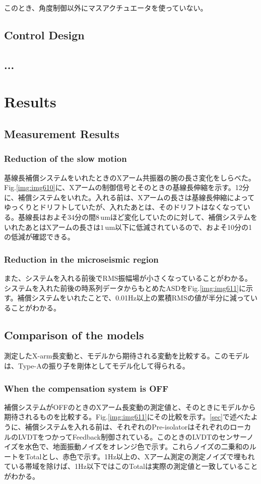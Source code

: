 このとき、角度制御以外にマスアクチュエータを使っていない。


\subsection{Control Design}


\subsection{...}


\section{Results}
\subsection{Measurement Results}
\subsubsection{Reduction of the slow motion}
基線長補償システムをいれたときのXアーム共振器の腕の長さ変化をしらべた。Fig.\ref{img:img610}に、Xアームの制御信号とそのときの基線長伸縮を示す。12分に、補償システムをいれた。入れる前は、Xアームの長さは基線長伸縮によってゆっくりとドリフトしていたが、入れたあとは、そのドリフトはなくなっている。基線長はおよそ34分の間$8\,\mathrm{um}$ほど変化していたのに対して、補償システムをいれたあとはXアームの長さは$1\,\mathrm{um}$以下に低減されているので、およそ10分の1の低減が確認できる。

\subsubsection{Reduction in the microseismic region}
また、システムを入れる前後でRMS振幅場が小さくなっていることがわかる。システムを入れた前後の時系列データからもとめたASDをFig.\ref{img:img611}に示す。補償システムをいれたことで、0.01Hz以上の累積RMSの値が半分に減っていることがわかる。

\subsection{Comparison of the models}
測定したX-arm長変動と、モデルから期待される変動を比較する。このモデルは、Type-Aの振り子を剛体としてモデル化して得られる\cite{sekiguchi2016astudy}。

\subsubsection{When the compensation system is OFF}
補償システムがOFFのときのXアーム長変動の測定値と、そのときにモデルから期待されるものを比較する。Fig.\ref{img:img611}にその比較を示す。\cref{sec}で述べたように、補償システムを入れる前は、それぞれのPre-isolatorはそれぞれのローカルのLVDTをつかってFeedback制御されている。このときのLVDTのセンサーノイズを水色で、地面振動ノイズをオレンジ色で示す。これらノイズの二乗和のルートをTotalとし、赤色で示す。1Hz以上の、Xアーム測定の測定ノイズで埋もれている帯域を除けば、1Hz以下ではこのTotalは実際の測定値と一致していることがわかる。

